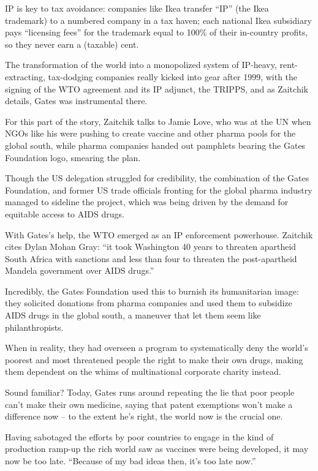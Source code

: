 \documentclass[
]{book}
\begin{document}
IP is key to tax avoidance: companies like Ikea transfer ``IP'' (the Ikea trademark) to a numbered company in a tax haven; each national Ikea subsidiary pays ``licensing fees'' for the trademark equal to 100\% of their in-country profits, so they never earn a (taxable) cent.

The transformation of the world into a monopolized system of IP-heavy, rent-extracting, tax-dodging companies really kicked into gear after 1999, with the signing of the WTO agreement and its IP adjunct, the TRIPPS, and as Zaitchik details, Gates was instrumental there.

For this part of the story, Zaitchik talks to Jamie Love, who was at the UN when NGOs like his were pushing to create vaccine and other pharma pools for the global south, while pharma companies handed out pamphlets bearing the Gates Foundation logo, smearing the plan.

Though the US delegation struggled for credibility, the combination of the Gates Foundation, and former US trade officials fronting for the global pharma industry managed to sideline the project, which was being driven by the demand for equitable access to AIDS drugs.

With Gates's help, the WTO emerged as an IP enforcement powerhouse. Zaitchik cites Dylan Mohan Gray: ``it took Washington 40 years to threaten apartheid South Africa with sanctions and less than four to threaten the post-apartheid Mandela government over AIDS drugs.''

Incredibly, the Gates Foundation used this to burnish its humanitarian image: they solicited donations from pharma companies and used them to subsidize AIDS drugs in the global south, a maneuver that let them seem like philanthropists.

When in reality, they had overseen a program to systematically deny the world's poorest and most threatened people the right to make their own drugs, making them dependent on the whims of multinational corporate charity instead.

Sound familiar? Today, Gates runs around repeating the lie that poor people can't make their own medicine, saying that patent exemptions won't make a difference now -- to the extent he's right, the world now is the crucial one.

Having sabotaged the efforts by poor countries to engage in the kind of production ramp-up the rich world saw as vaccines were being developed, it may now be too late. ``Because of my bad ideas then, it's too late now.''
\end{document}
